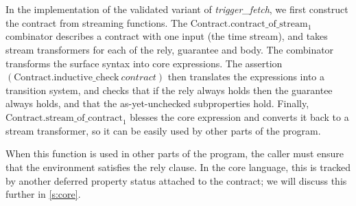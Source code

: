 In the implementation of the validated variant of \emph{trigger_fetch}, we first construct the contract from streaming functions.
The $\text{Contract.contract_of_stream}_1$ combinator describes a contract with one input (the time stream), and takes stream transformers for each of the rely, guarantee and body.
The combinator transforms the surface syntax into core expressions.
The assertion $(\text{Contract.inductive_check}~\textit{contract})$ then translates the expressions into a transition system, and checks that if the rely always holds then the guarantee always holds, and that the as-yet-unchecked subproperties hold.
Finally, $\text{Contract.stream_of_contract}_1$ blesses the core expression and converts it back to a stream transformer, so it can be easily used by other parts of the program.

When this function is used in other parts of the program, the caller must ensure that the environment satisfies the rely clause.
In the core language, this is tracked by another deferred property status attached to the contract; we will discuss this further in \autoref{s:core}.


